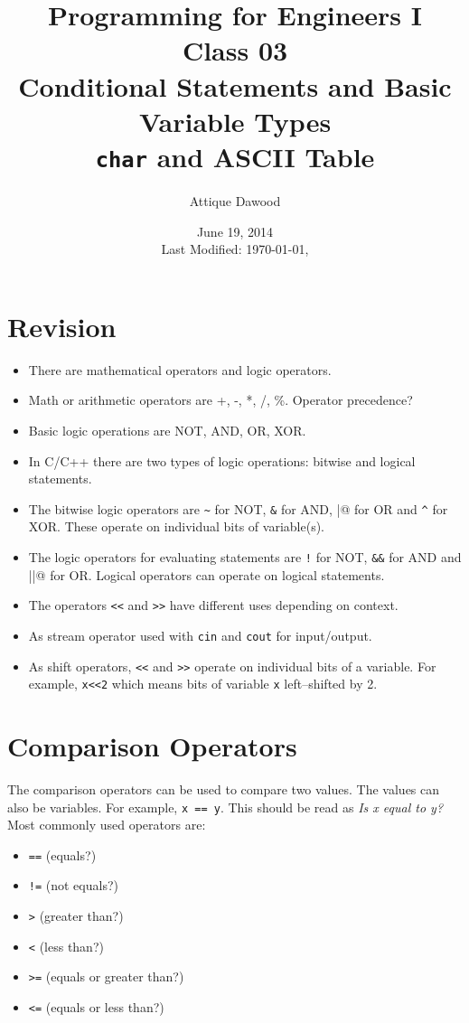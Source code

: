 \documentclass[12pt,a4paper]{article}
\title{Programming for Engineers I\\Class 03\\Conditional Statements and Basic Variable Types\\ \texttt{char} and ASCII Table}
\author{Attique Dawood}
\date{June 19, 2014\\[0.2cm] Last Modified: \today, \currenttime}
\begin{document}
\maketitle
\section{Revision}
\begin{itemize}
\item There are mathematical operators and logic operators.
\item Math or arithmetic operators are +, -, *, /, \%. Operator precedence?
\item Basic logic operations are NOT, AND, OR, XOR.
\item In C/C++ there are two types of logic operations: bitwise and logical statements.
\item The bitwise logic operators are \verb|~| for NOT, \verb|&| for AND, \verb@|@ for OR and \verb|^| for XOR. These operate on individual bits of variable(s).
\item The logic operators for evaluating statements are \verb|!| for NOT, \verb|&&| for AND and \verb@||@ for OR. Logical operators can operate on logical statements.
\item The operators \verb|<<| and \verb|>>| have different uses depending on context.
\item As stream operator used with \verb|cin| and \verb|cout| for input/output.
\item As shift operators, \verb|<<| and \verb|>>| operate on individual bits of a variable. For example, \verb|x<<2| which means bits of variable \verb|x| left--shifted by 2.
\end{itemize}
\section{Comparison Operators}
The comparison operators can be used to compare two values. The values can also be variables.  For example, \verb|x == y|. This should be read as \textit{Is x equal to y?} Most commonly used operators are:
\begin{itemize}
\item \verb|==| (equals?)
\item \verb|!=| (not equals?)
\item \verb|>| (greater than?)
\item \verb|<| (less than?)
\item \verb|>=| (equals or greater than?)
\item \verb|<=| (equals or less than?)
\end{itemize}
\end{document}
